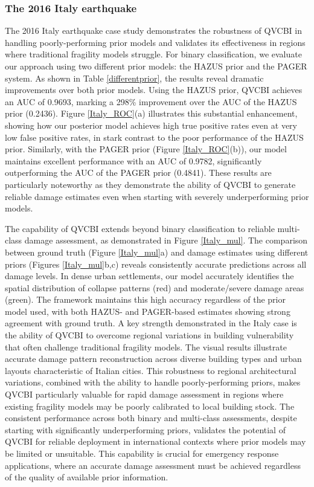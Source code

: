 \documentclass[review]{elsarticle}
\begin{document}
\subsubsection{The 2016 Italy earthquake}

The 2016 Italy earthquake case study demonstrates the robustness of QVCBI in handling poorly-performing prior models and validates its effectiveness in regions where traditional fragility models struggle. For binary classification, we evaluate our approach using two different prior models: the HAZUS prior \cite{del2017empirical} and the PAGER system. As shown in Table \ref{differentprior}, the results reveal dramatic improvements over both prior models. Using the HAZUS prior, QVCBI achieves an AUC of 0.9693, marking a 298\% improvement over the AUC of the HAZUS prior (0.2436). Figure \ref{Italy_ROC}(a) illustrates this substantial enhancement, showing how our posterior model achieves high true positive rates even at very low false positive rates, in stark contrast to the poor performance of the HAZUS prior. Similarly, with the PAGER prior (Figure \ref{Italy_ROC}(b)), our model maintains excellent performance with an AUC of 0.9782, significantly outperforming the AUC of the PAGER prior (0.4841). These results are particularly noteworthy as they demonstrate the ability of QVCBI to generate reliable damage estimates even when starting with severely underperforming prior models.

The capability of QVCBI extends beyond binary classification to reliable multi-class damage assessment, as demonstrated in Figure \ref{Italy_mul}. The comparison between ground truth (Figure \ref{Italy_mul}a) and damage estimates using different priors (Figures \ref{Italy_mul}b,c) reveals consistently accurate predictions across all damage levels. In dense urban settlements, our model accurately identifies the spatial distribution of collapse patterns (red) and moderate/severe damage areas (green). The framework maintains this high accuracy regardless of the prior model used, with both HAZUS- and PAGER-based estimates showing strong agreement with ground truth.
A key strength demonstrated in the Italy case is the ability of QVCBI to overcome regional variations in building vulnerability that often challenge traditional fragility models. The visual results illustrate accurate damage pattern reconstruction across diverse building types and urban layouts characteristic of Italian cities. This robustness to regional architectural variations, combined with the ability to handle poorly-performing priors, makes QVCBI particularly valuable for rapid damage assessment in regions where existing fragility models may be poorly calibrated to local building stock.
The consistent performance across both binary and multi-class assessments, despite starting with significantly underperforming priors, validates the potential of QVCBI for reliable deployment in international contexts where prior models may be limited or unsuitable. This capability is crucial for emergency response applications, where an accurate damage assessment must be achieved regardless of the quality of available prior information.
\end{document}
